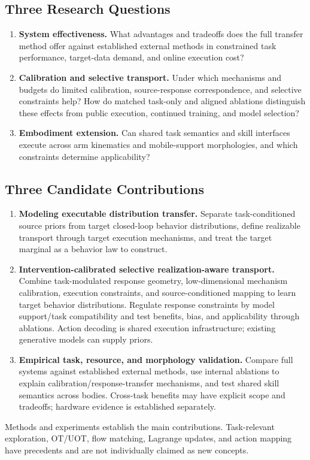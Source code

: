 \documentclass[11pt]{article}
\begin{document}
\subsection{Three Research Questions}
\begin{enumerate}[label=\textbf{RQ\arabic*.}]
\item \textbf{System effectiveness.} What advantages and tradeoffs does the full transfer method offer against established external methods in constrained task performance, target-data demand, and online execution cost?
\item \textbf{Calibration and selective transport.} Under which mechanisms and budgets do limited calibration, source-response correspondence, and selective constraints help? How do matched task-only and aligned ablations distinguish these effects from public execution, continued training, and model selection?
\item \textbf{Embodiment extension.} Can shared task semantics and skill interfaces execute across arm kinematics and mobile-support morphologies, and which constraints determine applicability?
\end{enumerate}

\subsection{Three Candidate Contributions}
\begin{enumerate}[label=\textbf{C\arabic*.}]
\item \textbf{Modeling executable distribution transfer.} Separate task-conditioned source priors from target closed-loop behavior distributions, define realizable transport through target execution mechanisms, and treat the target marginal as a behavior law to construct.
\item \textbf{Intervention-calibrated selective realization-aware transport.} Combine task-modulated response geometry, low-dimensional mechanism calibration, execution constraints, and source-conditioned mapping to learn target behavior distributions. Regulate response constraints by model support/task compatibility and test benefits, bias, and applicability through ablations. Action decoding is shared execution infrastructure; existing generative models can supply priors.
\item \textbf{Empirical task, resource, and morphology validation.} Compare full systems against established external methods, use internal ablations to explain calibration/response-transfer mechanisms, and test shared skill semantics across bodies. Cross-task benefits may have explicit scope and tradeoffs; hardware evidence is established separately.
\end{enumerate}
Methods and experiments establish the main contributions. Task-relevant exploration, OT/UOT, flow matching, Lagrange updates, and action mapping have precedents and are not individually claimed as new concepts.
\end{document}
